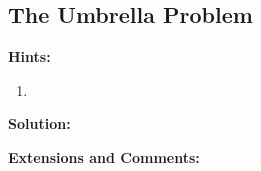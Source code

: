 \subsection{The Umbrella Problem}

\textbf{Hints:}

\begin{enumerate}
    \item 
\end{enumerate}

\textbf{Solution:}



\textbf{Extensions and Comments:}